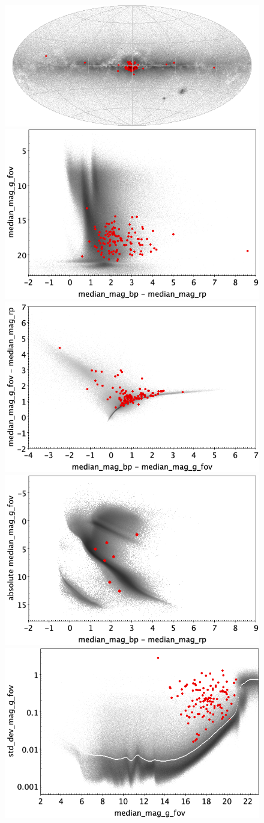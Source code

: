 \documentclass[longauth]{aa}
\begin{document}
\begin{appendix}
\begin{figure}
\centering
{} \includegraphics[width=0.6\hsize]{figures/appendix/MICROLENSING_trn_sky.png} \\ %
\vspace{4mm}
 \includegraphics[width=0.45\hsize]{figures/appendix/MICROLENSING_trn_cm.png}  %
\hspace{2mm}
 \includegraphics[width=0.45\hsize]{figures/appendix/MICROLENSING_trn_cc.png} \\ %
\vspace{4mm}
 \includegraphics[width=0.45\hsize]{figures/appendix/MICROLENSING_trn_cam.png}  %
\hspace{2mm}
 \includegraphics[width=0.45\hsize]{figures/appendix/MICROLENSING_trn_msd.png} \\ %

\end{figure}
\end{appendix}
\end{document}
